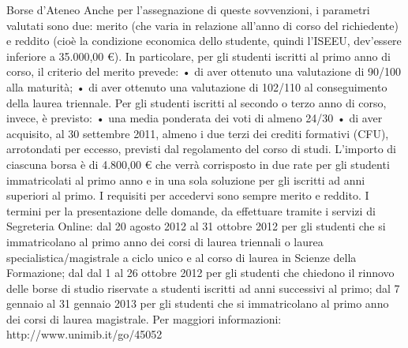 Borse d'Ateneo
Anche per l'assegnazione di queste sovvenzioni, i parametri valutati sono due: merito (che varia in relazione all'anno di corso del richiedente) e reddito (cioè la condizione economica dello studente, quindi l'ISEEU, dev'essere inferiore a 35.000,00 €). 
In particolare, per gli studenti iscritti al primo anno di corso, il criterio del merito prevede: 
      • di aver ottenuto una valutazione di 90/100 alla maturità; 
      • di aver ottenuto una valutazione di 102/110 al conseguimento della laurea triennale. 
Per gli studenti iscritti al secondo o terzo anno di corso, invece, è previsto: 
      • una media ponderata dei voti di almeno 24/30 
      • di  aver acquisito, al 30 settembre 2011, almeno i  due terzi dei crediti formativi (CFU), arrotondati per eccesso, previsti dal regolamento del corso di studi. 
L'importo di ciascuna borsa è di 4.800,00 € che verrà corrisposto in due rate per gli studenti immatricolati al primo anno e in una sola soluzione per gli iscritti ad anni superiori al primo. I requisiti per accedervi sono sempre merito e reddito.
I termini per la  presentazione delle domande, da effettuare tramite i servizi di Segreteria Online: dal 20 agosto 2012 al 31 ottobre 2012 per gli studenti che si immatricolano al primo anno dei corsi di laurea triennali o laurea specialistica/magistrale a ciclo unico e al corso di laurea in Scienze della Formazione; dal dal 1 al 26 ottobre 2012 per gli studenti che chiedono il rinnovo delle borse di studio riservate a studenti iscritti ad anni successivi al primo; dal 7 gennaio al 31 gennaio 2013 per gli studenti che si immatricolano al primo anno dei corsi di laurea magistrale. 
Per maggiori informazioni: http://www.unimib.it/go/45052
